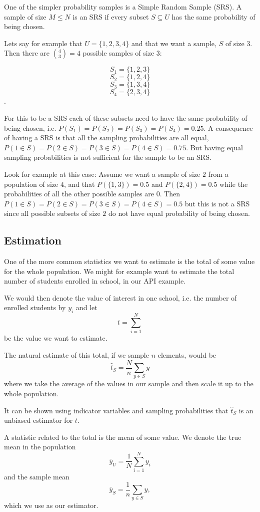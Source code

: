 \documentclass{article}
\begin{document}
One of the simpler probability samples is a Simple Random Sample (SRS). A
sample of size $M \leq N$ is an SRS if every subset $S \subseteq U$ has the same
probability of being chosen.

Lets say for example that $U = \{1, 2, 3, 4\}$ and that we want a sample, $S$ of
size $3$. Then there are $\binom{4}{3} = 4$  possible samples of size $3$:

$$ S_1 = \{1, 2, 3\} $$
$$ S_2 = \{1, 2, 4\} $$
$$ S_3 = \{1, 3, 4\} $$
$$ S_4 = \{2, 3, 4\} $$.

For this to be a SRS each of these subsets need to have the same probability of
being chosen, i.e. $P(S_1) = P(S_2) = P(S_3) = P(S_4) = 0.25$. A consequence of
having a SRS is that all the sampling probabilities are all equal, $P(1 \in S) =
P(2 \in S) = P(3 \in S) = P(4 \in S) = 0.75$. But having equal sampling
probabilities is not sufficient for the sample to be an SRS.

Look for example at this case:
Assume we want a sample of size $2$ from a population of size $4$, and that
$P(\{1, 3\}) = 0.5$ and $P(\{2, 4\}) = 0.5$ while the probabilities of all the
other possible samples are $0$. Then $P(1 \in S) = P(2 \in S) = P(3 \in S) = P(4 \in S) = 0.5$
but this is not a SRS since all possible subsets of size $2$ do not have equal
probability of being chosen.


\subsection{Estimation}

One of the more common statistics we want to estimate is the total of some value
for the whole population. We might for example want to estimate the total number
of students enrolled in school, in our API example.

We would then denote the value of interest in one school, i.e. the number of
enrolled students by $y_i$ and let
$$t = \sum_{i = 1}^{N}$$
be the value we want to estimate.

The natural estimate of this total, if we sample $n$ elements, would be
$$ \hat{t}_S = \frac{N}{n}\sum_{y \in S} y $$
where we take the average of the values in our sample and then scale it up to
the whole population.

It can be shown using indicator variables and sampling probabilities that
$\hat{t}_S$ is an unbiased estimator for $t$.


A statistic related to the total is the mean of some value. We denote the true
mean in the population
$$\bar{y}_U = \frac{1}{N} \sum_{i = 1}^{N} y_i$$
and the sample mean
$$\bar{y}_S = \frac{1}{n} \sum_{y \in S} y ,$$
which we use as our estimator.
\end{document}
